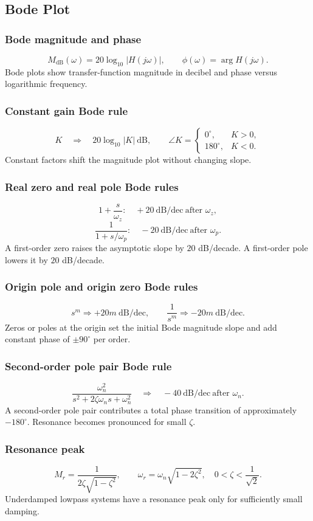 \subsection{Bode Plot}

\subsubsection{Bode magnitude and phase}
\[
M_{\mathrm{dB}}(\omega)=20\log_{10}|H(j\omega)|,\qquad
\phi(\omega)=\arg H(j\omega).
\]
Bode plots show transfer-function magnitude in decibel and phase versus logarithmic frequency.

\subsubsection{Constant gain Bode rule}
\[
K \quad \Rightarrow \quad 20\log_{10}|K| \ \mathrm{dB},\qquad
\angle K=
\begin{cases}
0^\circ,&K>0,\\
180^\circ,&K<0.
\end{cases}
\]
Constant factors shift the magnitude plot without changing slope.

\subsubsection{Real zero and real pole Bode rules}
\[
1+\frac{s}{\omega_z}: \quad +20\ \mathrm{dB/dec}\ \text{after }\omega_z,
\]
\[
\frac{1}{1+s/\omega_p}: \quad -20\ \mathrm{dB/dec}\ \text{after }\omega_p.
\]
A first-order zero raises the asymptotic slope by \(20\) dB/decade. A first-order pole lowers it by \(20\) dB/decade.

\subsubsection{Origin pole and origin zero Bode rules}
\[
s^m \Rightarrow +20m\ \mathrm{dB/dec},\qquad
\frac{1}{s^m}\Rightarrow -20m\ \mathrm{dB/dec}.
\]
Zeros or poles at the origin set the initial Bode magnitude slope and add constant phase of \(\pm 90^\circ\) per order.

\subsubsection{Second-order pole pair Bode rule}
\[
\frac{\omega_n^2}{s^2+2\zeta\omega_n s+\omega_n^2}
\quad \Rightarrow \quad -40\ \mathrm{dB/dec}\ \text{after }\omega_n.
\]
A second-order pole pair contributes a total phase transition of approximately \(-180^\circ\). Resonance becomes pronounced for small \(\zeta\).

\subsubsection{Resonance peak}
\[
M_r=\frac{1}{2\zeta\sqrt{1-\zeta^2}},
\qquad
\omega_r=\omega_n\sqrt{1-2\zeta^2},
\quad 0<\zeta<\frac{1}{\sqrt{2}}.
\]
Underdamped lowpass systems have a resonance peak only for sufficiently small damping.
